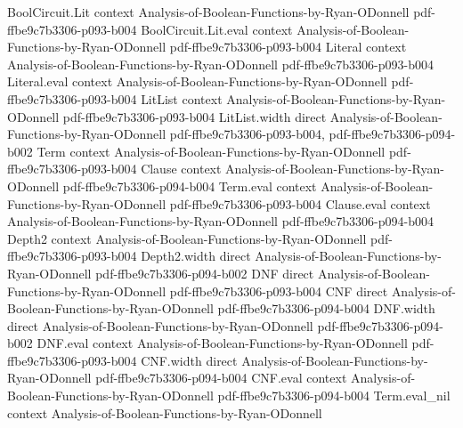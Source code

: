 \begin{theorem}
\leanok
{}
\proofstep
  {BoolCircuit.Lit}
  {context}
  {Analysis-of-Boolean-Functions-by-Ryan-ODonnell}
  {pdf-ffbe9c7b3306-p093-b004}
\proofstep
  {BoolCircuit.Lit.eval}
  {context}
  {Analysis-of-Boolean-Functions-by-Ryan-ODonnell}
  {pdf-ffbe9c7b3306-p093-b004}
\proofstep
  {Literal}
  {context}
  {Analysis-of-Boolean-Functions-by-Ryan-ODonnell}
  {pdf-ffbe9c7b3306-p093-b004}
\proofstep
  {Literal.eval}
  {context}
  {Analysis-of-Boolean-Functions-by-Ryan-ODonnell}
  {pdf-ffbe9c7b3306-p093-b004}
\proofstep
  {LitList}
  {context}
  {Analysis-of-Boolean-Functions-by-Ryan-ODonnell}
  {pdf-ffbe9c7b3306-p093-b004}
\proofstep
  {LitList.width}
  {direct}
  {Analysis-of-Boolean-Functions-by-Ryan-ODonnell}
  {pdf-ffbe9c7b3306-p093-b004,
    pdf-ffbe9c7b3306-p094-b002}
\proofstep
  {Term}
  {context}
  {Analysis-of-Boolean-Functions-by-Ryan-ODonnell}
  {pdf-ffbe9c7b3306-p093-b004}
\proofstep
  {Clause}
  {context}
  {Analysis-of-Boolean-Functions-by-Ryan-ODonnell}
  {pdf-ffbe9c7b3306-p094-b004}
\proofstep
  {Term.eval}
  {context}
  {Analysis-of-Boolean-Functions-by-Ryan-ODonnell}
  {pdf-ffbe9c7b3306-p093-b004}
\proofstep
  {Clause.eval}
  {context}
  {Analysis-of-Boolean-Functions-by-Ryan-ODonnell}
  {pdf-ffbe9c7b3306-p094-b004}
\proofstep
  {Depth2}
  {context}
  {Analysis-of-Boolean-Functions-by-Ryan-ODonnell}
  {pdf-ffbe9c7b3306-p093-b004}
\proofstep
  {Depth2.width}
  {direct}
  {Analysis-of-Boolean-Functions-by-Ryan-ODonnell}
  {pdf-ffbe9c7b3306-p094-b002}
\proofstep
  {DNF}
  {direct}
  {Analysis-of-Boolean-Functions-by-Ryan-ODonnell}
  {pdf-ffbe9c7b3306-p093-b004}
\proofstep
  {CNF}
  {direct}
  {Analysis-of-Boolean-Functions-by-Ryan-ODonnell}
  {pdf-ffbe9c7b3306-p094-b004}
\proofstep
  {DNF.width}
  {direct}
  {Analysis-of-Boolean-Functions-by-Ryan-ODonnell}
  {pdf-ffbe9c7b3306-p094-b002}
\proofstep
  {DNF.eval}
  {context}
  {Analysis-of-Boolean-Functions-by-Ryan-ODonnell}
  {pdf-ffbe9c7b3306-p093-b004}
\proofstep
  {CNF.width}
  {direct}
  {Analysis-of-Boolean-Functions-by-Ryan-ODonnell}
  {pdf-ffbe9c7b3306-p094-b004}
\proofstep
  {CNF.eval}
  {context}
  {Analysis-of-Boolean-Functions-by-Ryan-ODonnell}
  {pdf-ffbe9c7b3306-p094-b004}
\proofstep
  {Term.eval_nil}
  {context}
  {Analysis-of-Boolean-Functions-by-Ryan-ODonnell}

\end{theorem}
